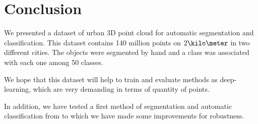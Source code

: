 \documentclass[a4paper, 10pt, journal]{article}
\begin{document}
%  


\section{Conclusion}

We presented a dataset of urban 3D point cloud for automatic segmentation and classification. This dataset contains 140 million points on $2\kilo\meter$ in two different cities. The objects were segmented by hand and a class was associated with each one among 50 classes.

We hope that this dataset will help to train and evaluate methods as deep-learning, which are very demanding in terms of quantity of points.

In addition, we have tested a first method of segmentation and automatic classification from \cite{roynard2016fast} to which we have made some improvements for robustness.


%

\end{document}
